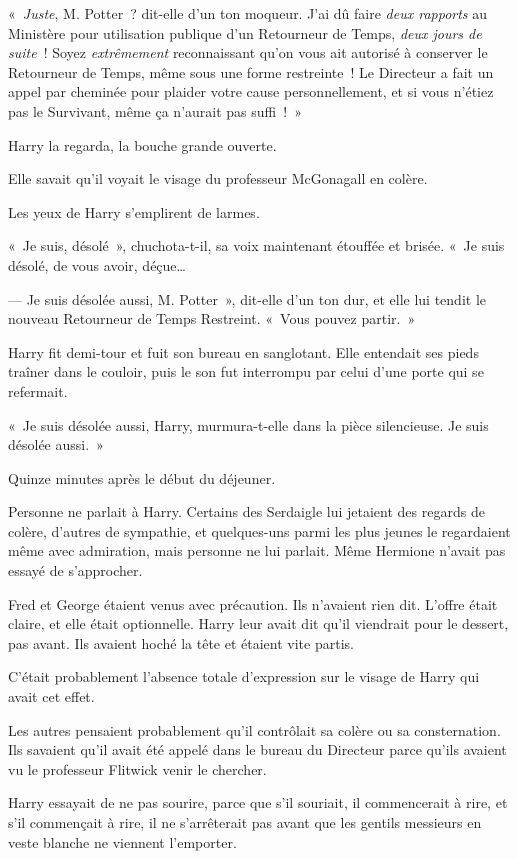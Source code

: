 «~\emph{Juste}, M. Potter~? dit-elle d'un ton moqueur. J'ai dû faire \emph{deux rapports} au Ministère pour utilisation publique d'un Retourneur de Temps, \emph{deux jours de suite}~! Soyez \emph{extrêmement} reconnaissant qu'on vous ait autorisé à conserver le Retourneur de Temps, même sous une forme restreinte~! Le Directeur a fait un appel par cheminée pour plaider votre cause personnellement, et si vous n'étiez pas le Survivant, même ça n'aurait pas suffi~!~»

Harry la regarda, la bouche grande ouverte.

Elle savait qu'il voyait le visage du professeur McGonagall en colère.

Les yeux de Harry s'emplirent de larmes.

«~Je suis, désolé~», chuchota-t-il, sa voix maintenant étouffée et brisée. «~Je suis désolé, de vous avoir, déçue…

--- Je suis désolée aussi, M. Potter~», dit-elle d'un ton dur, et elle lui tendit le nouveau Retourneur de Temps Restreint. «~Vous pouvez partir.~»

Harry fit demi-tour et fuit son bureau en sanglotant. Elle entendait ses pieds traîner dans le couloir, puis le son fut interrompu par celui d'une porte qui se refermait.

«~Je suis désolée aussi, Harry, murmura-t-elle dans la pièce silencieuse. Je suis désolée aussi.~»

\later

Quinze minutes après le début du déjeuner.

Personne ne parlait à Harry. Certains des Serdaigle lui jetaient des regards de colère, d'autres de sympathie, et quelques-uns parmi les plus jeunes le regardaient même avec admiration, mais personne ne lui parlait. Même Hermione n'avait pas essayé de s'approcher.

Fred et George étaient venus avec précaution. Ils n'avaient rien dit. L'offre était claire, et elle était optionnelle. Harry leur avait dit qu'il viendrait pour le dessert, pas avant. Ils avaient hoché la tête et étaient vite partis.

C'était probablement l'absence totale d'expression sur le visage de Harry qui avait cet effet.

Les autres pensaient probablement qu'il contrôlait sa colère ou sa consternation. Ils savaient qu'il avait été appelé dans le bureau du Directeur parce qu'ils avaient vu le professeur Flitwick venir le chercher.

Harry essayait de ne pas sourire, parce que s'il souriait, il commencerait à rire, et s'il commençait à rire, il ne s'arrêterait pas avant que les gentils messieurs en veste blanche ne viennent l'emporter.


